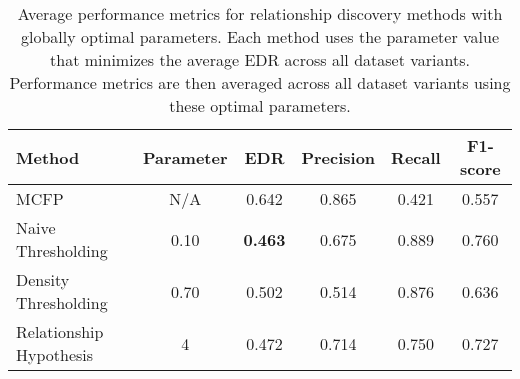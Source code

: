 \begin{table}[ht]
\centering
\caption{Average performance metrics for relationship discovery methods with globally optimal parameters. Each method uses the parameter value that minimizes the average EDR across all dataset variants. Performance metrics are then averaged across all dataset variants using these optimal parameters.}
\label{tab:relationship_methods_global_optimal}
\begin{tabular}{lccccc}
\toprule
Method & Parameter & EDR & Precision & Recall & F1-score \\
\midrule
MCFP & N/A & 0.642 & 0.865 & 0.421 & 0.557 \\
Naive Thresholding & 0.10 & \textbf{0.463} & 0.675 & 0.889 & 0.760 \\
Density Thresholding & 0.70 & 0.502 & 0.514 & 0.876 & 0.636 \\
Relationship Hypothesis & 4 & 0.472 & 0.714 & 0.750 & 0.727 \\
\bottomrule
\end{tabular}
\end{table}
